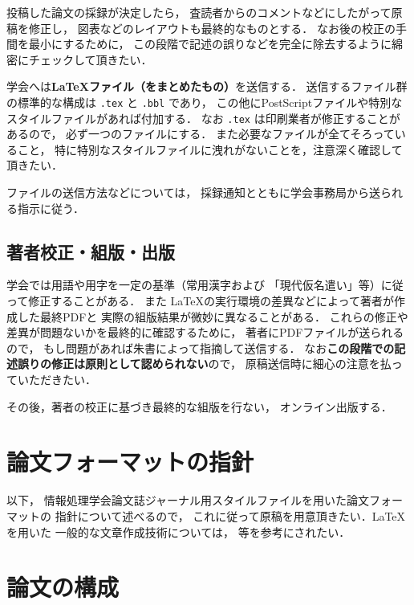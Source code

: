 \documentclass[submit]{ipsj}
\def\|{\verb|}
\begin{document}
投稿した論文の採録が決定したら，
査読者からのコメントなどにしたがって原稿を修正し，
図表などのレイアウトも最終的なものとする．
なお後の校正の手間を最小にするために，
この段階で記述の誤りなどを完全に除去するように綿密にチェックして頂きたい．



学会へは{\bf \LaTeX ファイル（をまとめたもの）}を送信する．
送信するファイル群の標準的な構成は \|.tex| と \|.bbl| であり，
この他にPostScriptファイルや特別なスタイルファイルがあれば付加する．
なお \|.tex| は印刷業者が修正することがあるので，
{必ず一つのファイルにする}．
また必要なファイルが全てそろっていること，
特に特別なスタイルファイルに洩れがないことを，注意深く確認して頂きたい．


ファイルの送信方法などについては，
採録通知とともに学会事務局から送られる指示に従う．




\subsection{著者校正・組版・出版}


学会では用語や用字を一定の基準（常用漢字および
「現代仮名遣い」等）に従って修正することがある．
また \LaTeX の実行環境の差異などによって著者が作成した最終PDFと
実際の組版結果が微妙に異なることがある．
これらの修正や差異が問題ないかを最終的に確認するために，
著者にPDFファイルが送られるので，
もし問題があれば朱書によって指摘して送信する．
なお{\bf この段階での記述誤りの修正は原則として認められない}ので，
原稿送信時に細心の注意を払っていただきたい．


その後，著者の校正に基づき最終的な組版を行ない，
オンライン出版する．




\section{論文フォーマットの指針}
\label{sec:format}

以下，
情報処理学会論文誌ジャーナル用スタイルファイルを用いた論文フォーマットの
指針について述べるので，
これに従って原稿を用意頂きたい．\LaTeX を用いた
一般的な文章作成技術については，\cite{okumura, companion} 等を参考にされたい．



\section{論文の構成}
\label{config}
\end{document}
